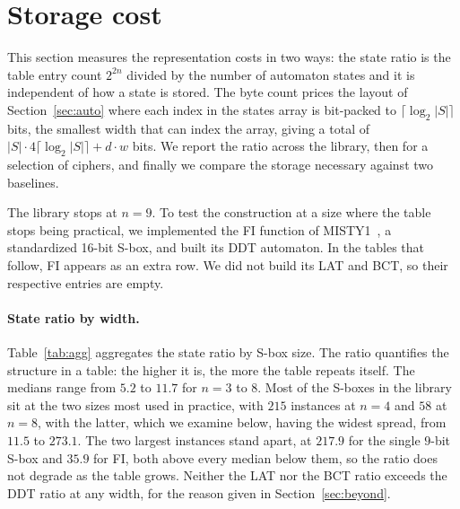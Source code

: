 \documentclass[runningheads]{llncs}
\begin{document}
\section{Storage cost}
\label{sec:results}

This section measures the representation costs in two ways: the state ratio is the table entry count $2^{2n}$ divided by the number of automaton states and it is independent of how a state is stored. The byte count prices the layout of Section~\ref{sec:auto} where each index in the states array is bit-packed to $\lceil\log_{2}|S|\rceil$ bits, the smallest width that can index the array, giving a total of $|S| \cdot 4 \lceil \log_{2} |S| \rceil + d \cdot w$ bits. We report the ratio across the library, then for a selection of ciphers, and finally we compare the storage necessary against two baselines.

The library stops at $n=9$. To test the construction at a size where the table stops being practical, we implemented the FI function of MISTY1~\cite{rfc2994}, a standardized 16-bit S-box, and built its DDT automaton. In the tables that follow, FI appears as an extra row. We did not build its LAT and BCT, so their respective entries are empty.


\paragraph{State ratio by width.}
Table~\ref{tab:agg} aggregates the state ratio by S-box size. The ratio quantifies the structure in a table: the higher it is, the more the table repeats itself. The medians range from $5.2$ to $11.7$ for $n=3$ to $8$. Most of the S-boxes in the library sit at the two sizes most used in practice, with $215$ instances at $n=4$ and $58$ at $n=8$, with the latter, which we examine below, having the widest spread, from $11.5$ to $273.1$. The two largest instances stand apart, at $217.9$ for the single $9$-bit S-box and $35.9$ for FI, both above every median below them, so the ratio does not degrade as the table grows. Neither the LAT nor the BCT ratio exceeds the DDT ratio at any width, for the reason given in Section~\ref{sec:beyond}.
\end{document}
